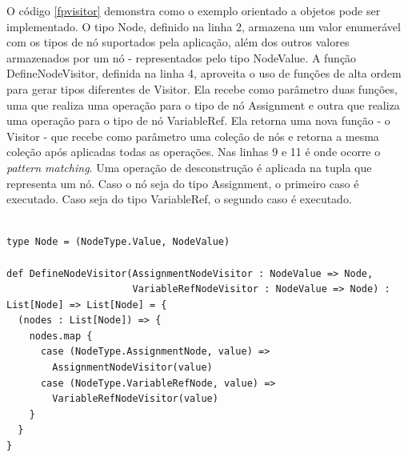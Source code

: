 O código \ref{fpvisitor} demonstra como o 
exemplo orientado a objetos pode ser implementado. 
O tipo Node, definido na linha 2, armazena um valor 
enumerável com os tipos de nó suportados 
pela aplicação, além dos outros valores 
armazenados por um nó - representados pelo tipo 
NodeValue. A função DefineNodeVisitor, definida 
na linha 4, aproveita o uso de funções de alta ordem 
para gerar tipos diferentes de Visitor. Ela 
recebe como parâmetro duas funções, uma que 
realiza uma operação para o tipo de nó Assignment e 
outra que realiza uma operação para o tipo de 
nó VariableRef. Ela retorna uma nova função - o 
Visitor - que recebe como parâmetro uma coleção 
de nós e retorna a mesma coleção após aplicadas 
todas as operações. Nas linhas 9 e 11 é onde 
ocorre o \textit{pattern matching}. Uma operação 
de desconstrução é aplicada na tupla que representa 
um nó. Caso o nó seja do tipo Assignment, o 
primeiro caso é executado. Caso seja do tipo 
VariableRef, o segundo caso é executado.

\begin{lstlisting}[caption={Visitor Funcional},label=fpvisitor]
    
type Node = (NodeType.Value, NodeValue)

def DefineNodeVisitor(AssignmentNodeVisitor : NodeValue => Node,
                      VariableRefNodeVisitor : NodeValue => Node) :
List[Node] => List[Node] = {
  (nodes : List[Node]) => {
    nodes.map {
      case (NodeType.AssignmentNode, value) => 
        AssignmentNodeVisitor(value)
      case (NodeType.VariableRefNode, value) => 
        VariableRefNodeVisitor(value)
    }
  }
}
    
\end{lstlisting}